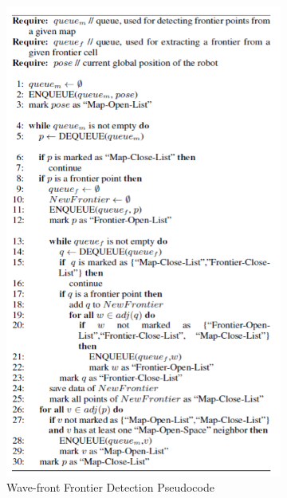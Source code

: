 \documentclass[a4paper,12pt]{article}
\begin{document}
				\begin{figure}[H]
					\centering
					\begin{subfigure}{.5\textwidth}
						\centering
						\includegraphics[width=.9\linewidth]{images/wfdPseudocode.png}
						\caption{Wave-front Frontier Detection Pseudocode}
						\label{wfdPseudocode}
					\end{subfigure}%
					\begin{subfigure}{.5\textwidth}
						\centering

\end{subfigure}
\end{figure}
\end{document}
